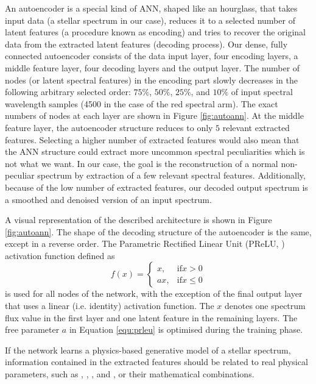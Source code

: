 An autoencoder is a special kind of ANN, shaped like an hourglass, that takes input data (a stellar spectrum in our case), reduces it to a selected number of latent features (a procedure known as encoding) and tries to recover the original data from the extracted latent features (decoding process). Our dense, fully connected autoencoder consists of the data input layer, four encoding layers, a middle feature layer, four decoding layers and the output layer. The number of nodes (or latent spectral features) in the encoding part slowly decreases in the following arbitrary selected order: $75\%$, $50\%$, $25\%$, and $10\%$ of input spectral wavelength samples (4500 in the case of the red spectral arm). The exact numbers of nodes at each layer are shown in Figure \ref{fig:autoann}. At the middle feature layer, the autoencoder structure reduces to only $5$ relevant extracted features. Selecting a higher number of extracted features would also mean that the ANN structure could extract more uncommon spectral peculiarities which is not what we want. In our case, the goal is the reconstruction of a normal non-peculiar spectrum by extraction of a few relevant spectral features. Additionally, because of the low number of extracted features, our decoded output spectrum is a smoothed and denoised version of an input spectrum.

A visual representation of the described architecture is shown in Figure \ref{fig:autoann}. The shape of the decoding structure of the autoencoder is the same, except in a reverse order. The Parametric Rectified Linear Unit (PReLU, \cite{2015arXiv150201852H}) activation function defined as
\begin{equation}
f(x) = \begin{cases}
x, & \mathrm{if} x > 0 \\
ax, & \mathrm{if} x \le 0
\end{cases}
\label{equ:prleu}
\end{equation}
is used for all nodes of the network, with the exception of the final output layer that uses a linear (i.e. identity) activation function. The $x$ denotes one spectrum flux value in the first layer and one latent feature in the remaining layers. The free parameter $a$ in Equation \ref{equ:prleu} is optimised during the training phase.

If the network learns a physics-based generative model of a stellar spectrum, information contained in the extracted features should be related to real physical parameters, such as \Teff, \Logg, \Feh, and \vsin, or their mathematical combinations. 

